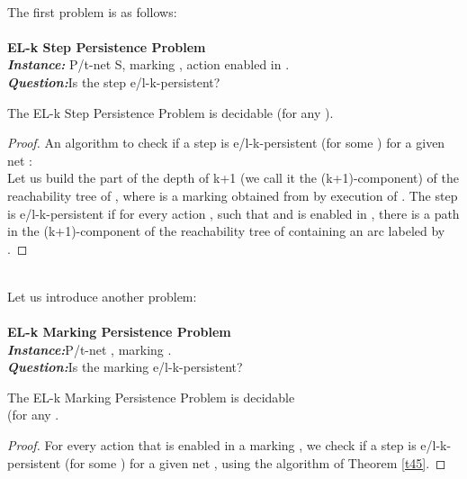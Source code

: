 \documentclass[a4paper]{llncs}
\begin{document}
\mbox{ }\\
The first problem is as follows:
\\ \\
\textbf{EL-k Step Persistence Problem}
\\
\indent\textbf{\emph{Instance:}} P/t-net S, marking , action  enabled in .\\
\indent\textbf{\emph{Question:}}Is the step  e/l-k-persistent?

\begin{theorem}
\label{t45}
The EL-k Step Persistence Problem is decidable (for any ).
\end{theorem}

\begin{proof}
An algorithm to check if a step  is e/l-k-persistent (for some ) for a given net :\\
Let us build the part of the depth of k+1 (we call it the (k+1)-component) of the reachability tree of , where  is a marking obtained from  by execution of . The step  is e/l-k-persistent if for every action , such that  and  is enabled in , there is a path in the (k+1)-component of the reachability tree of  containing an arc labeled by . 	
\end{proof}\mbox{ }\\
Let us introduce another problem:
\\ \\
\textbf{EL-k Marking Persistence Problem}
\\
\indent\textbf{\emph{Instance:}}P/t-net , marking .\\
\indent\textbf{\emph{Question:}}Is the marking  e/l-k-persistent?

\begin{theorem}
\label{t46}
The EL-k Marking Persistence Problem is decidable \\
\indent\indent\indent (for any .
\end{theorem}

\begin{proof}
For every action  that is enabled in a marking , we check if a step  is e/l-k-persistent (for some ) for a given net , using the algorithm of Theorem \ref{t45}. 	
\end{proof}
\end{document}
